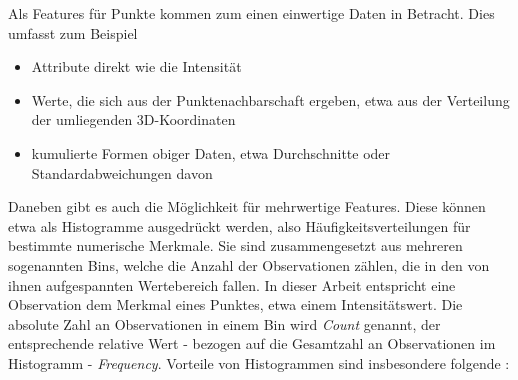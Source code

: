 Als Features für Punkte kommen zum einen einwertige Daten in Betracht. Dies umfasst zum Beispiel
\begin{itemize}
    \item Attribute direkt wie die Intensität
    \item Werte, die sich aus der Punktenachbarschaft ergeben, etwa aus der Verteilung der umliegenden 3D-Koordinaten
    \item kumulierte Formen obiger Daten, etwa Durchschnitte oder Standardabweichungen davon
\end{itemize}
Daneben gibt es auch die Möglichkeit für mehrwertige Features. Diese können etwa als Histogramme ausgedrückt werden, also Häufigkeitsverteilungen für bestimmte numerische Merkmale. Sie sind zusammengesetzt aus mehreren sogenannten Bins, welche die Anzahl der Observationen zählen, die in den von ihnen aufgespannten Wertebereich fallen. In dieser Arbeit entspricht eine Observation dem Merkmal eines Punktes, etwa einem Intensitätswert. Die absolute Zahl an Observationen in einem Bin wird \textit{Count} genannt, der entsprechende relative Wert - bezogen auf die Gesamtzahl an Observationen im Histogramm - \textit{Frequency}. Vorteile von Histogrammen sind insbesondere folgende \citep{Rusu.etal-2008}:
